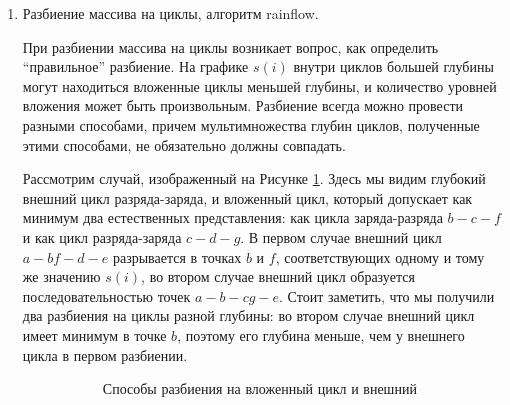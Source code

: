 \begin{enumerate}
\item Разбиение массива на циклы, алгоритм rainflow.

При разбиении массива на циклы возникает вопрос, как определить ``правильное'' разбиение.
На графике $s(i)$ внутри циклов большей глубины могут находиться вложенные циклы меньшей глубины, и количество уровней вложения может быть произвольным.
Разбиение всегда можно провести разными способами, причем мультимножества глубин циклов, полученные этими способами, не обязательно должны совпадать.

Рассмотрим случай, изображенный на Рисунке \ref{fig:nested-cycle}.
Здесь мы видим глубокий внешний цикл разряда-заряда, и вложенный цикл, который допускает как минимум два естественных представления: как цикла заряда-разряда $b-c-f$ и как цикл разряда-заряда $c-d-g$.
В первом случае внешний цикл $a-bf-d-e$ разрывается в точках $b$ и $f$, соответствующих одному и тому же значению $s(i)$, во втором случае внешний цикл образуется последовательностью точек $a-b-cg-e$.
Стоит заметить, что мы получили два разбиения на циклы разной глубины: во втором случае внешний цикл имеет минимум в точке $b$, поэтому его глубина меньше, чем у внешнего цикла в первом разбиении.


\begin{figure}[h]
\centering
\begin{subfigure}[b]{0.45\textwidth}
\centering
{}
\caption{Способы разбиения на вложенный цикл и внешний}
\label{fig:nested-cycle}
\end{subfigure}
\hfill
\begin{subfigure}[b]{0.45\textwidth}
\centering
{}
\end{subfigure}
\end{figure}
\end{enumerate}

